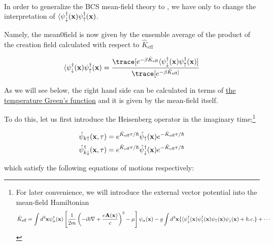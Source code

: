 \dotfill

\ 

In order to generalize the BCS mean-field theory to {}, we have only to change the interpretation of $\langle\psi_{\downarrow}^\dagger({\bf x})\psi_{\uparrow}^\dagger({\bf x})$. 

Namely, the mean0field is now given by the ensemble average of the product of the creation field calculated with respect to $\hat{K}_{\text{eff}}$

\[\langle\psi_{\downarrow}^\dagger({\bf x})\psi_{\uparrow}^\dagger({\bf x}) = \frac{\trace[e^{-\beta\hat{K}_{\text{eff}}}\langle\psi_{\downarrow}^\dagger({\bf x})\psi_{\uparrow}^\dagger({\bf x})]}{\trace[e^{-\beta\hat{K}_{\text{eff}}]}} \]

As we will see below, the right hand side can be calculated in terms of \uline{the temperature Green's function} and it is given by the mean-field itself. 

To do this, let us first introduce the Heisenberg operator in the imaginary time;\footnote{For later convenience, we will introduce the external vector potential into the mean-field Hamiltonian
\[\hat{K}_{\text{eff}}=\int d^3{\bf x}\psi_{\alpha}^\dagger({\bf x})\left[\frac{1}{2m}\left(-i\hbar\nabla+\frac{e{\bf A}({\bf x})}{c}\right)^2-\mu\right]\psi_{\alpha}({\bf x}) - g\int d^3{\bf x}\{\langle\psi_{\downarrow}^\dagger({\bf x})\psi_{\uparrow}^\dagger({\bf x})\psi_{\uparrow}({\bf x})\psi_{\downarrow}({\bf x})+ h.c.\}+\cdots \]}

\[\begin{split}
\hat{\psi}_{k\uparrow}({\bf x},\tau) &= e^{\hat{K}_{\text{eff}}\tau/\hbar}\hat{\psi}_{\uparrow}({\bf x})e^{-\hat{K}_{\text{eff}}\tau/\hbar}\\
\hat{\psi}^\dagger_{k\downarrow}({\bf x},\tau) &= e^{\hat{K}_{\text{eff}}\tau/\hbar}\hat{\psi}^\dagger_{\downarrow}({\bf x})e^{-\hat{K}_{\text{eff}}\tau/\hbar}
\end{split} \]

which satisfy the following  equations of motions respectively:

